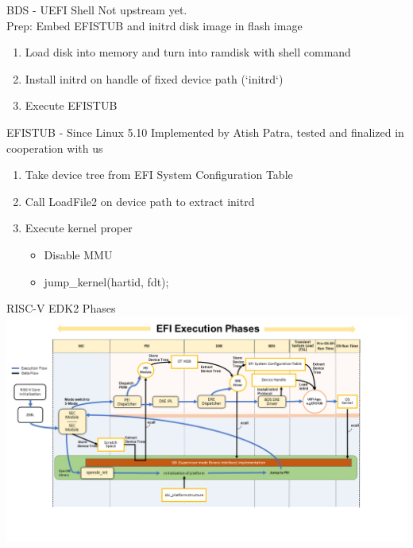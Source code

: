 \documentclass[
  10pt
]{beamer}
\begin{document}
\begin{frame}{BDS - UEFI Shell}
  Not upstream yet. \\
  Prep: Embed EFISTUB and initrd disk image in flash image

  \vfill

  \begin{enumerate}
    \item Load disk into memory and turn into ramdisk with shell command
    \item Install initrd on handle of fixed device path (`initrd`)
    \item Execute EFISTUB
  \end{enumerate}
\end{frame}

\begin{frame}{EFISTUB - Since Linux 5.10}
  Implemented by Atish Patra, tested and finalized in cooperation with us

  \vfill

  \begin{enumerate}
    \item Take device tree from EFI System Configuration Table
    \item Call LoadFile2 on device path to extract initrd
    \item Execute kernel proper
    \begin{itemize}
      \item Disable MMU
      \item jump\_kernel(hartid, fdt);
    \end{itemize}
  \end{enumerate}
\end{frame}

\begin{frame}{RISC-V EDK2 Phases}
    \includegraphics[width=1.15\textwidth]{resources/bootflow-annotated.png}
\end{frame}
\end{document}
